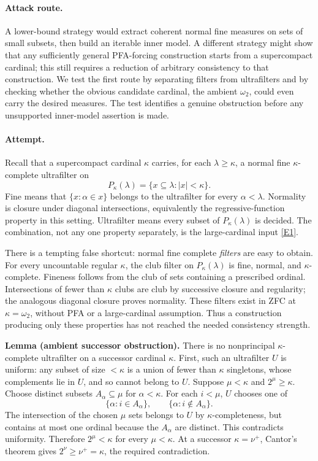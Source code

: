 \documentclass[11pt,a4paper]{article}
\newcommand{\eref}[2]{\hyperlink{extra:#1:#2}{[E#2]}}
\numberwithin{equation}{section}
\begin{document}
\paragraph{Attack route.}
A lower-bound strategy would extract coherent normal fine measures on sets of small subsets, then build an iterable inner model. A different strategy might show that any sufficiently general PFA-forcing construction starts from a supercompact cardinal; this still requires a reduction of arbitrary consistency to that construction. We test the first route by separating filters from ultrafilters and by checking whether the obvious candidate cardinal, the ambient $\omega_2$, could even carry the desired measures. The test identifies a genuine obstruction before any unsupported inner-model assertion is made.

\paragraph{Attempt.}
Recall that a supercompact cardinal $\kappa$ carries, for each $\lambda\ge\kappa$, a normal fine $\kappa$-complete ultrafilter on
\[
 P_\kappa(\lambda)=\{x\subseteq\lambda:|x|<\kappa\}.
\]
Fine means that $\{x:\alpha\in x\}$ belongs to the ultrafilter for every $\alpha<\lambda$. Normality is closure under diagonal intersections, equivalently the regressive-function property in this setting. Ultrafilter means every subset of $P_\kappa(\lambda)$ is decided. The combination, not any one property separately, is the large-cardinal input \eref{statement}{1}.

There is a tempting false shortcut: normal fine complete \emph{filters} are easy to obtain. For every uncountable regular $\kappa$, the club filter on $P_\kappa(\lambda)$ is fine, normal, and $\kappa$-complete. Fineness follows from the club of sets containing a prescribed ordinal. Intersections of fewer than $\kappa$ clubs are club by successive closure and regularity; the analogous diagonal closure proves normality. These filters exist in ZFC at $\kappa=\omega_2$, without PFA or a large-cardinal assumption. Thus a construction producing only these properties has not reached the needed consistency strength.

\textbf{Lemma (ambient successor obstruction).} There is no nonprincipal $\kappa$-complete ultrafilter on a successor cardinal $\kappa$.
First, such an ultrafilter $U$ is uniform: any subset of size $<\kappa$ is a union of fewer than $\kappa$ singletons, whose complements lie in $U$, and so cannot belong to $U$.
Suppose $\mu<\kappa$ and $2^\mu\ge\kappa$. Choose distinct subsets $A_\alpha\subseteq\mu$ for $\alpha<\kappa$. For each $i<\mu$, $U$ chooses one of
\[
 \{\alpha:i\in A_\alpha\},\qquad\{\alpha:i\notin A_\alpha\}.
\]
The intersection of the chosen $\mu$ sets belongs to $U$ by $\kappa$-completeness, but contains at most one ordinal because the $A_\alpha$ are distinct. This contradicts uniformity. Therefore $2^\mu<\kappa$ for every $\mu<\kappa$. At a successor $\kappa=\nu^+$, Cantor's theorem gives $2^\nu\ge\nu^+=\kappa$, the required contradiction.
\end{document}
